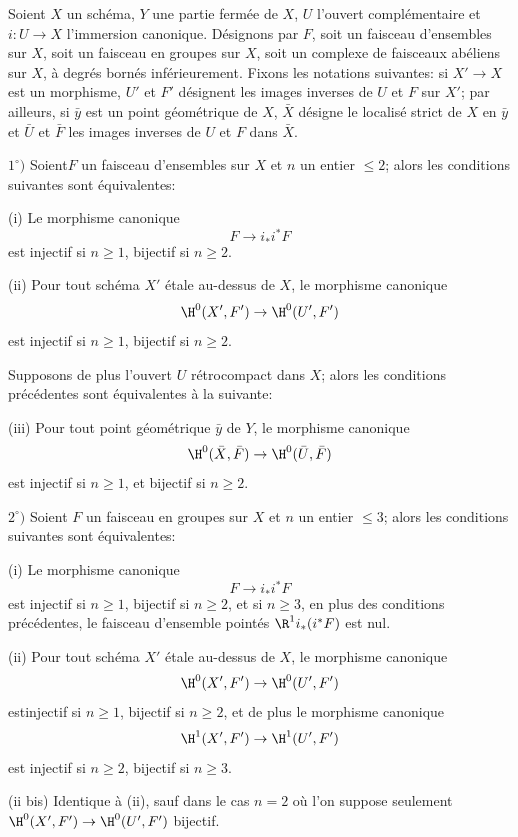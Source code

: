 \enlargethispage{\baselineskip}%
\begin{proposition} \label{XIV.1.1}
Soient $X$ un sch\'ema, $Y$ une partie ferm\'ee de $X$, $U$ l'ouvert compl\'ementaire et $i:U\to X$ l'immersion canonique. D\'esignons par $F$, soit un faisceau d'ensembles sur $X$, soit un faisceau en groupes sur $X$, soit un complexe de faisceaux ab\'eliens sur $X$, \`a degr\'es born\'es inf\'erieurement. Fixons les notations suivantes: si $X'\to X$ est un morphisme, $U'$ et $F'$ d\'esignent les images inverses de $U$ et $F$ sur $X'$; par ailleurs, si $\bar{y}$ est un point g\'eom\'etrique de $X$, $\bar{X}$ d\'esigne le localis\'e strict de $X$ en $\bar{y}$ et $\bar{U}$ et $\bar{F}$ les images inverses de $U$ et $F$ dans $\bar{X}$.

$1^\circ)$ Soient\pageoriginale $F$ un faisceau d'ensembles sur $X$ et $n$ un entier $\leq 2$; alors les conditions suivantes sont \'equivalentes:

\textup{(i)} Le morphisme canonique
$$F\to i_*i^*F$$
est injectif si $n\geq 1$, bijectif si $n\geq 2$.

\textup{(ii)} Pour tout sch\'ema $X'$ \'etale au-dessus de $X$, le morphisme canonique
$$
\H^0(X', F')\to \H^0(U', F')
$$
est injectif si $n\geq 1$, bijectif si $n\geq 2$.

Supposons de plus l'ouvert $U$ r\'etrocompact dans $X$; alors les conditions pr\'ec\'edentes sont \'equivalentes \`a la suivante:

\textup{(iii)} Pour tout point g\'eom\'etrique $\bar{y}$ de $Y$, le morphisme canonique
$$
\H^0(\bar{X}, \bar{F})\to \H^0(\bar{U}, \bar{F})$$
est injectif si $n\geq 1$, et bijectif si $n\geq 2$.

$2^\circ)$ Soient $F$ un faisceau en groupes sur $X$ et $n$ un entier $\leq 3$; alors les conditions suivantes sont \'equivalentes:

\textup{(i)} Le morphisme canonique
$$F\to i_*i^*F$$
est injectif si $n\geq 1$, bijectif si $n\geq 2$, et si $n\geq 3$, en plus des conditions pr\'ec\'edentes, le faisceau d'ensemble point\'es $\R^1i_*(i^*F)$ est nul.

\textup{(ii)} Pour tout sch\'ema $X'$ \'etale au-dessus de $X$, le morphisme canonique
$$
\H^0(X', F')\to \H^0(U', F')
$$
est\pageoriginale injectif si $n\geq 1$, bijectif si $n\geq 2$, et de plus le morphisme canonique
$$
\H^1(X', F')\to \H^1(U', F')
$$
est injectif si $n\geq 2$, bijectif si $n\geq 3$.

\textup{(ii bis)} Identique \`a \textup{(ii)}, sauf dans le cas $n=2$ o\`u l'on suppose seulement $\H^0(X', F')\to \H^0(U', F')$ bijectif.


\end{proposition}
